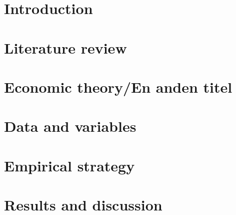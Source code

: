 


















\maketitle
\pagestyle{empty}
\clearpage

\small {
\tableofcontents
\listoffigures
\listoftables
}
\clearpage
\pagestyle{scrheadings}

\section{Introduction}


\section{Literature review}


\section{Economic theory/En anden titel}


\section{Data and variables}


\section{Empirical strategy}


\section{Results and discussion}


